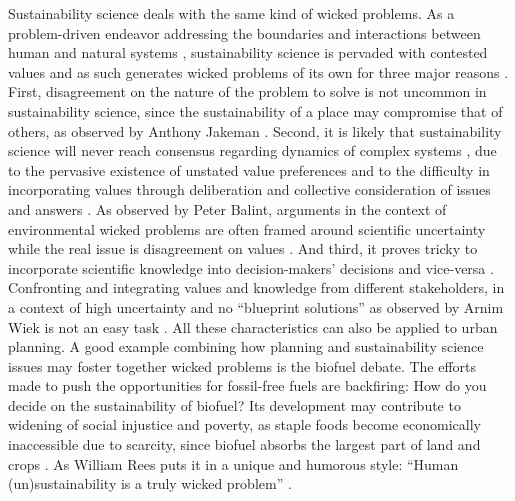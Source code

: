 \documentclass[10pt,a4paper]{article}
\begin{document}
\begin{multicols}{2}
Sustainability science deals with the same kind of wicked problems. As a problem-driven endeavor addressing the boundaries and interactions between human and natural systems \citep{r09, r10}, sustainability science is pervaded with contested values and as such generates wicked problems of its own for three major reasons \citep{r11, r12}. First, disagreement on the nature of the problem to solve is not uncommon in sustainability science, since the sustainability of a place may compromise that of others, as observed by Anthony Jakeman \citep{r13}. Second, it is likely that sustainability science will never reach consensus regarding dynamics of complex systems \citep{r14}, due to the pervasive existence of unstated value preferences \citep{r15} and to the difficulty in incorporating values through deliberation and collective consideration of issues and answers \citep{r16}. As observed by Peter Balint, arguments in the context of environmental wicked problems are often framed around scientific uncertainty while the real issue is disagreement on values \citep{r17}. And third, it proves tricky to incorporate scientific knowledge into decision-makers' decisions and vice-versa \citep{r18}. Confronting and integrating values and knowledge from different stakeholders, in a context of high uncertainty and no ``blueprint solutions'' as observed by Arnim Wiek is not an easy task \citep{r19}. All these characteristics can also be applied to urban planning. A good example combining how planning and sustainability science issues may foster together wicked problems is the biofuel debate. The efforts made to push the opportunities for fossil-free fuels are backfiring: How do you decide on the sustainability of biofuel? Its development may contribute to widening of social injustice and poverty, as staple foods become economically inaccessible due to scarcity, since biofuel absorbs the largest part of land and crops \citep{r20}. As William Rees puts it in a unique and humorous style: ``Human (un)sustainability is a truly wicked problem'' \citep{r21}.


\end{multicols}
\end{document}
